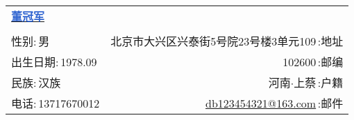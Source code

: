 \newcommand{\myheader}{
    \begin{tabular*}{\textwidth}{l@{\extracolsep{\fill}}r}
        \textbf{\href{https://herechen.github.io}{\LARGE \textcolor{highlight}{董冠军}}} \\
        \\
        {\color{blue}性别:}$\,$男 & 北京市大兴区兴泰街5号院23号楼3单元109$\,${\color{blue}:地址} \\
        {\color{blue}出生日期:}$\,$1978.09 & 102600$\,${\color{blue}:邮编} \\
        {\color{blue}民族:}$\,$汉族 & 河南$\cdot$上蔡$\,${\color{blue}:户籍} \\
        {\color{blue}电话:}$\,$13717670012 & \href{mailto:db123454321@163.com}{db123454321@163.com}$\,${\color{blue}:邮件} \\
    \end{tabular*}\\\vspace{0.1in}}

\myheader
